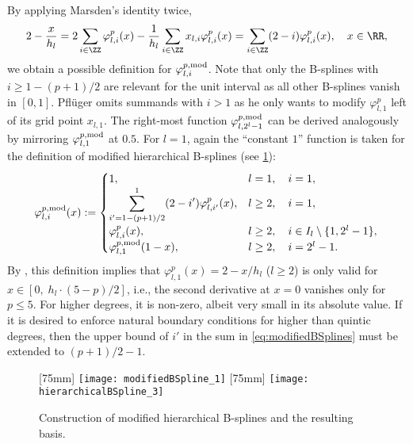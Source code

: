 By applying Marsden's identity twice,
\begin{equation}
  2 - \frac{x}{h_l}
  = 2 \sum_{i \in \ZZ} \varphi_{l,i}^p(x)
  - \frac{1}{h_l} \sum_{i \in \ZZ} x_{l,i} \varphi_{l,i}^p(x)
  = \sum_{i \in \ZZ} (2 - i) \varphi_{l,i}^p(x),\quad
  x \in \RR,
\end{equation}
we obtain a possible definition for $\varphi_{l,i}^{p,\mathrm{mod}}$.
Note that only the B-splines with $i \ge 1 - (p+1)/2$
are relevant for the unit interval as all other B-splines vanish in $[0, 1]$.
Pflüger omits summands with $i > 1$ as he only wants to modify
$\varphi_{l,1}^p$ left of its grid point $x_{l,1}$.
The right-most function $\varphi_{l,2^l-1}^{p,\mathrm{mod}}$ can be derived
analogously by mirroring $\varphi_{l,1}^{p,\mathrm{mod}}$ at $0.5$.
For $l = 1$, again the ``constant $1$'' function is taken for the definition
of modified hierarchical B-splines (see \cref{fig:modifiedBSpline}):
\begin{equation}
  \label{eq:modifiedBSplines}
  \varphi_{l,i}^{p,\mathrm{mod}}(x)
  :=
  \begin{cases}
    1,&
    l = 1,\quad i = 1,\\
    \displaystyle\sum_{i'=1-(p+1)/2}^1 (2 - i') \varphi_{l,i'}^p(x),&
    l \ge 2,\quad i = 1,\\
    \varphi_{l,i}^p(x),&
    l \ge 2,\quad i \in I_l \setminus \{1, 2^l - 1\},\\
    \varphi_{l,1}^{p,\mathrm{mod}}(1 - x),&
    l \ge 2,\quad i = 2^l - 1.
  \end{cases}
\end{equation}
By ,
this definition implies that
$\varphi_{l,1}^p(x) = 2 - x/h_l$ ($l \ge 2$)
is only valid for $x \in [0,\; h_l \cdot (5-p)/2]$, i.e.,
the second derivative at $x = 0$ vanishes only for $p \le 5$.
For higher degrees, it is non-zero, albeit very small
in its absolute value.
If it is desired to enforce natural boundary conditions
for higher than quintic degrees,
then the upper bound of $i'$ in the sum in \eqref{eq:modifiedBSplines}
must be extended to $(p+1)/2 - 1$.

\begin{figure}
  [75mm]{%
    \texttt{[image: modifiedBSpline\_1]}%
  }%
  \hfill%
  [75mm]{%
    \texttt{[image: hierarchicalBSpline\_3]}%
  }%
  \caption{%
    Construction of modified hierarchical B-splines and
    the resulting basis.%
  }
  \label{fig:modifiedBSpline}
\end{figure}




